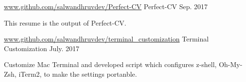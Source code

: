 

\begin{cventries}

  \cventry
    {\url{www.github.com/salwandhruvdev/Perfect-CV}} %
    {Perfect-CV} %
    {Sep. 2017} %
    {}
    {
      \begin{cvitems} %
        \item {This resume is the output of Perfect-CV.}
      \end{cvitems}
    }

  \cventry
    {\url{www.github.com/salwandhruvdev/terminal_customization}} %
    {Terminal Customization} %
    {July. 2017} %
    {}
    {
      \begin{cvitems} %
        \item {Customize Mac Terminal and developed script which configures z-shell, Oh-My-Zsh, iTerm2, to make the settings portanble.}
      \end{cvitems}
    }

\end{cventries}
